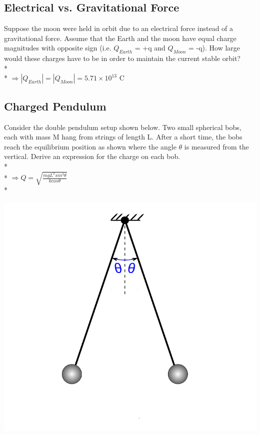 \documentclass[11pt]{article}
\begin{document}
\subsection{Electrical vs. Gravitational Force}
Suppose the moon were held in orbit due to an electrical force instead of a gravitational force.  Assume that the Earth and the moon have equal charge magnitudes with opposite sign (i.e. $Q_{Earth}$ = +q and $Q_{Moon}$ = -q).  How large would these charges have to be in order to maintain the current stable orbit? \\* \\*
$\Rightarrow |Q_{Earth}| = |Q_{Moon}| = 5.71\times10^{13}$ C

\pagebreak
\subsection{Charged Pendulum}
Consider the double pendulum setup shown below.  Two small spherical bobs, each with mass M hang from strings of length L.  After a short time, the bobs reach the equilibrium position as shown where the angle $\theta$ is measured from the vertical.  Derive an expression for the charge on each bob.\\* \\*
$\Rightarrow Q = \sqrt{\frac{mgL^2sin^3\theta}{kcos\theta}}$ \\*

\begin{center}
\includegraphics[scale=0.25]{Images/pendulum.png}
\end{center}
\end{document}
